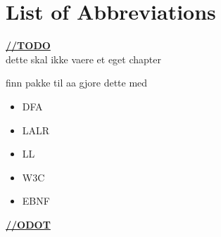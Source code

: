 \chapter{List of Abbreviations}


\underline{\textbf{\LARGE //TODO}}
\normalsize \\
dette skal ikke vaere et eget chapter

finn pakke til aa gjore dette med

\begin{itemize}
\item DFA
\item LALR
\item LL
\item W3C
\item EBNF
\end{itemize}


\underline{\textbf{\LARGE //ODOT}}
